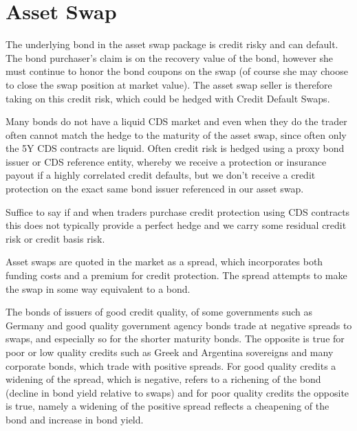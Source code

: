 \documentclass[12pt,a4paper]{article}
\begin{document}
\section{Asset Swap}

The underlying bond in the asset swap package is credit risky and can default. The bond purchaser’s claim is on the recovery value of the bond, however she must continue to honor the bond coupons on the swap (of course she may choose to close the swap position at market value). The asset swap seller is therefore taking on this credit risk, which could be hedged with Credit Default Swaps.

Many bonds do not have a liquid CDS market and even when they do the trader often cannot match the hedge to the maturity of the asset swap, since often only the 5Y CDS contracts are liquid. Often credit risk is hedged using a proxy bond issuer or CDS reference entity, whereby we receive a protection or insurance payout if a highly correlated credit defaults, but we don’t receive a credit protection on the exact same bond issuer referenced in our asset swap.

Suffice to say if and when traders purchase credit protection using CDS contracts this does not typically provide a perfect hedge and we carry some residual credit risk or credit basis risk.

Asset swaps are quoted in the market as a spread, which incorporates both funding costs and a premium for credit protection. The spread attempts to make the swap in some way equivalent to a bond.

The bonds of issuers of good credit quality, of some governments such as Germany and good quality government agency bonds trade at negative spreads to swaps, and especially so for the shorter maturity bonds. The opposite is true for poor or low quality credits such as Greek and Argentina sovereigns and many corporate bonds, which trade with positive spreads. For good quality credits a widening of the spread, which is negative, refers to a richening of the bond (decline in bond yield relative to swaps) and for poor quality credits the opposite is true, namely a widening of the positive spread reflects a cheapening of the bond and increase in bond yield.
\end{document}
